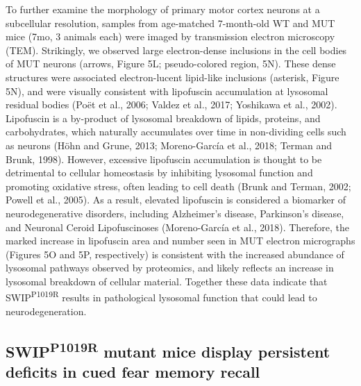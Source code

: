 To further examine the morphology of primary motor cortex neurons at a
subcellular resolution, samples from age-matched 7-month-old WT and MUT mice
(7mo, 3 animals each) were imaged by transmission electron microscopy (TEM).
Strikingly, we observed large electron-dense inclusions in the cell bodies of
MUT neurons (arrows, Figure 5L; pseudo-colored region, 5N). These dense
structures were associated electron-lucent lipid-like inclusions (asterisk,
Figure 5N), and were visually consistent with lipofuscin accumulation at
lysosomal residual bodies (Poët et al., 2006; Valdez et al., 2017; Yoshikawa et
al., 2002). Lipofuscin is a by-product of lysosomal breakdown of lipids,
proteins, and carbohydrates, which naturally accumulates over time in
non-dividing cells such as neurons (Höhn and Grune, 2013; Moreno-García et al.,
2018; Terman and Brunk, 1998). However, excessive lipofuscin accumulation is
thought to be detrimental to cellular homeostasis by inhibiting lysosomal
function and promoting oxidative stress, often leading to cell death (Brunk and
Terman, 2002; Powell et al., 2005). As a result, elevated lipofuscin is
considered a biomarker of neurodegenerative disorders, including Alzheimer’s
disease, Parkinson’s disease, and Neuronal Ceroid Lipofuscinoses (Moreno-García
et al., 2018). Therefore, the marked increase in lipofuscin area and number seen
in MUT electron micrographs (Figures 5O and 5P, respectively) is consistent with
the increased abundance of lysosomal pathways observed by proteomics, and likely
reflects an increase in lysosomal breakdown of cellular material. Together these
data indicate that SWIP\textsuperscript{P1019R} results in pathological lysosomal function that
could lead to neurodegeneration. 

\subsection{SWIP\textsuperscript{P1019R} mutant mice display persistent deficits 
in cued fear memory recall}


